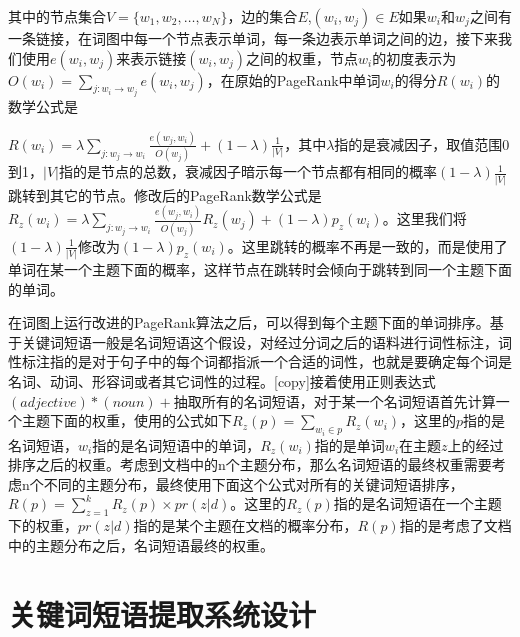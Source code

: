 \documentclass[master]{njuthesis}
\begin{document}
其中的节点集合$V=\{w_1,w_2,\dots,w_N\}$，边的集合$E$,$\left(w_i,w_j\right) \in E$如果$w_i$和$w_j$之间有一条链接，在词图中每一个节点表示单词，每一条边表示单词之间的边，接下来我们使用$e\left(w_i,w_j\right)$来表示链接$\left(w_i,w_j\right)$之间的权重，节点$w_i$的初度表示为$O\left(w_i\right) = \sum_{j:w_i \rightarrow w_j} e\left(w_i,w_j\right)$，在原始的PageRank中单词$w_i$的得分$R\left(w_i\right)$的数学公式是

$R\left( w_i \right) = \lambda \sum_{j:w_j \rightarrow w_i} \frac{e\left(w_j,w_i\right)}{O\left(w_j\right)}+\left(1-\lambda\right)\frac{1}{\vert V \vert}$，其中$\lambda$指的是衰减因子，取值范围0到1，$\vert V \vert$指的是节点的总数，衰减因子暗示每一个节点都有相同的概率$\left(1-\lambda\right)\frac{1}{\vert V \vert}$跳转到其它的节点。修改后的PageRank数学公式是$R_z\left( w_i \right) = \lambda \sum_{j:w_j \rightarrow w_i} \frac{e\left(w_j, w_i\right)}{O\left(w_j\right)}R_z\left(w_j\right)+\left( 1-\lambda \right)p_z\left(w_i\right)$。这里我们将$\left(1-\lambda\right)\frac{1}{\vert V \vert}$修改为$\left( 1-\lambda\right)p_z\left(w_i\right)$。这里跳转的概率不再是一致的，而是使用了单词在某一个主题下面的概率，这样节点在跳转时会倾向于跳转到同一个主题下面的单词。

在词图上运行改进的PageRank算法之后，可以得到每个主题下面的单词排序。基于关键词短语一般是名词短语这个假设，对经过分词之后的语料进行词性标注，词性标注指的是对于句子中的每个词都指派一个合适的词性，也就是要确定每个词是名词、动词、形容词或者其它词性的过程。[copy]接着使用正则表达式$\left(adjective\right)*\left(noun\right)+$抽取所有的名词短语，对于某一个名词短语首先计算一个主题下面的权重，使用的公式如下$R_z\left(p\right) = \sum_{w_i \in p} R_z\left(w_i\right)$，这里的$p$指的是名词短语，$w_i$指的是名词短语中的单词，$R_z\left(w_i\right)$指的是单词$w_i$在主题$z$上的经过排序之后的权重。考虑到文档中的n个主题分布，那么名词短语的最终权重需要考虑n个不同的主题分布，最终使用下面这个公式对所有的关键词短语排序，$R\left(p\right) = \sum_{z=1}^k R_z\left(p\right) \times pr\left(z \vert d \right)$。这里的$R_z\left(p\right)$指的是名词短语在一个主题下的权重，$pr\left(z\vert d\right)$指的是某个主题在文档的概率分布，$R\left(p\right)$指的是考虑了文档中的主题分布之后，名词短语最终的权重。

\section{关键词短语提取系统设计}
\end{document}
